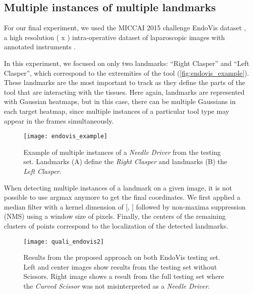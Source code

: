 \documentclass[10pt,twocolumn,letterpaper]{article}
\begin{document}
\subsection{Multiple instances of multiple landmarks}


For our final experiment, we used the MICCAI 2015 challenge EndoVis dataset \cite{endovis}, a high resolution ( x ) intra-operative dataset of laparoscopic images with annotated
instruments \cite{tmi}.

In this experiment, we focused on only two landmarks: ``Right Clasper''
and ``Left Clasper'', which correspond to the extremities of the tool
(\autoref{fig:endovis_example}). These landmarks are the most important to track as
they define the parts of the tool that are interacting with the tissues. Here again,
landmarks are represented with Gaussian heatmaps, but in this case,
there can be multiple Gaussians in each target heatmap, since multiple instances of a particular tool type may appear in the frames simultaneously.

\begin{figure}[H]
  \begin{center}
    \centering
	\texttt{[image: endovis\_example]}
	\caption{Example of multiple instances of a \textit{Needle Driver} from the testing set.
          Landmarks (A) define the \textit{Right Clasper} and landmarks (B)
          the \textit{Left Clasper}.}
	\label{fig:endovis_example}
  \end{center}
\end{figure}

When detecting multiple instances of a landmark on a given image, it
is not possible to use argmax anymore to get the final coordinates.
We first applied a median filter with a kernel dimension of [, ]
followed by non-maxima suppression (NMS) using a window size of 
pixels.  Finally, the centers of the remaining clusters of points
correspond to the localization of the detected landmarks.

\begin{figure*}[ht]
  \begin{center}
    \centering
	\texttt{[image: quali\_endovis2]}
	\caption{Results from the proposed approach on both EndoVis testing set.
          Left and center images show results from the testing set without Scissors.
          Right image shows a result from the full testing set where the
          \textit{Curved Scissor} was not misinterpreted as a \textit{Needle Driver}.}
	\label{fig:quali_endovis}
  \end{center}
\end{figure*}
\end{document}
